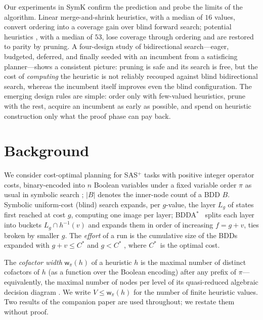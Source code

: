\documentclass[letterpaper]{article}
\newcommand{\copt}{\ensuremath{C^{*}}}
\newcommand{\width}{\ensuremath{\mathsf{w}}}
\newcommand{\values}{\ensuremath{V}}
\newcommand{\bddastar}{BDDA\ensuremath{^{*}}}
\theoremstyle{plain}
\theoremstyle{definition}
\theoremstyle{remark}
\begin{document}
Our experiments in SymK \citep{speck-et-al-jair2025} confirm the
prediction and probe the limits of the algorithm. Linear merge-and-shrink
heuristics, with a median of $16$ values, convert ordering into a
coverage gain over blind forward search; potential heuristics
\citep{pommerening-et-al-aaai2015,fiser-et-al-aij2024}, with a median of
$53$, lose coverage through ordering and are restored to parity by
pruning. A four-design study of bidirectional search---eager, budgeted,
deferred, and finally seeded with an incumbent from a satisficing
planner---shows a consistent picture: pruning is safe and its search is
free, but the cost of \emph{computing} the heuristic is not reliably
recouped against blind bidirectional search, whereas the incumbent
itself improves even the blind configuration. The emerging design rules
are simple: order only with few-valued heuristics, prune with the rest,
acquire an incumbent as early as possible, and spend on heuristic
construction only what the proof phase can pay back.

\section{Background}

We consider cost-optimal planning for SAS$^{+}$ tasks
\citep{backstrom-nebel-compint1995} with positive integer operator
costs, binary-encoded into $n$ Boolean variables under a fixed variable
order $\pi$ as usual in symbolic search
\citep{torralba-et-al-aij2017,kissmann-hoffmann-jair2014}; $|B|$ denotes
the inner-node count of a BDD $B$. Symbolic uniform-cost (blind) search
expands, per $g$-value, the layer $L_g$ of states first reached at cost
$g$, computing one image per layer; \bddastar\
\citep{edelkamp-reffel-ki1998} splits each layer into buckets
$L_g \cap h^{-1}(v)$ and expands them in order of increasing $f = g+v$,
ties broken by smaller $g$. The \emph{effort} of a run is the cumulative
size of the BDDs expanded with $g + v \leq \copt$ and $g < \copt$
\citep{speck-et-al-icaps2020}, where \copt\ is the optimal cost.

The \emph{cofactor width} $\width_\pi(h)$ of a heuristic $h$ is the
maximal number of distinct cofactors of $h$ (as a function over the
Boolean encoding) after any prefix of $\pi$---equivalently, the maximal
number of nodes per level of its quasi-reduced algebraic decision
diagram \citep{wegener-2000}. We write $\values \leq \width_\pi(h)$ for
the number of finite heuristic values. Two results of the companion
paper are used throughout; we restate them without proof.
\end{document}
